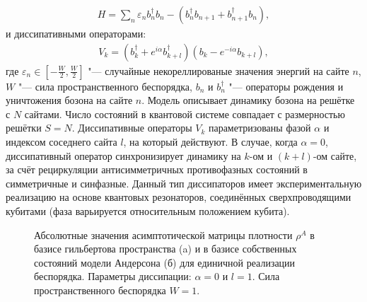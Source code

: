 \begin{equation}
	\label{eq:anderson_H}
	\begin{gathered}
		H = \sum_{n} \varepsilon_n b^\dagger_n b_n - \left(b^\dagger_n b_{n+1} + b^\dagger_{n+1} b_{n}\right),
	\end{gathered}
\end{equation}
и диссипативными операторами:
\begin{equation}
	\label{eq:anderson_diss_local}
	\begin{gathered}
		V_k = \left( b^\dagger_k + e^{i \alpha} b^\dagger_{k+l}\right) \left( b_k - e^{-i \alpha} b_{k+l} \right),
	\end{gathered}
\end{equation}
где \(\varepsilon_n \in \left[-\frac{W}{2}, \frac{W}{2}\right]\) "--- случайные некореллированые значения энергий на сайте \(n\), \(W\) "--- сила пространственного беспорядка, \(b_n\) и \(b^\dagger_n\) "--- операторы рождения и уничтожения бозона на сайте \(n\).
Модель описывает динамику бозона на решётке с $N$ сайтами. 
Число состояний в квантовой системе совпадает с размерностью решётки $S=N$.
Диссипативные операторы $V_k$ \cite{Diehl2008} параметризованы фазой $\alpha$ и индексом соседнего сайта $l$, на который действуют.
В случае, когда \(\alpha = 0\), диссипативный оператор синхронизирует динамику на \(k\)-ом и \((k+l)\)-ом сайте, за счёт рециркуляции антисимметричных противофазных состояний в симметричные и синфазные. 
Данный тип диссипаторов имеет экспериментальную реализацию на основе квантовых резонаторов, соединённых сверхпроводящими кубитами (фаза варьируется относительным положением кубита).

\begin{figure}[ht]
	\legend{}
	\caption[Асимптотическая матрица плотности с локализацией Андерсона]
	{
		Абсолютные значения асимптотической матрицы плотности \(\rho^A\) в базисе гильбертова пространства (a) и в базисе собственных состояний модели Андерсона (б) для единичной реализации беспорядка. Параметры диссипации: \(\alpha=0\) и \(l=1\). Сила пространственного беспорядка \(W=1\).
	}
	\label{fig:anderson_rho_loc}
\end{figure}

